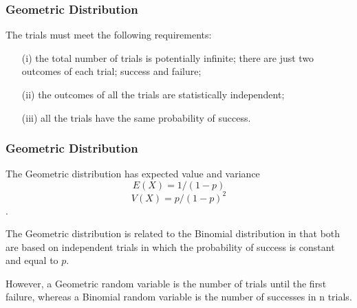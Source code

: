 \documentclass[IntroMain.tex]{subfiles}
\begin{document}
\begin{frame}
	\frametitle{Geometric Distribution}
	\Large
The trials must meet the following requirements:

\begin{itemize}
\item[(i)] the total number of trials is potentially infinite;
there are just two outcomes of each trial; success and failure;
\item[(ii)] the outcomes of all the trials are statistically independent;
\item[(iii)] all the trials have the same probability of success.
\end{itemize}
\end{frame}
\begin{frame}
	\frametitle{Geometric Distribution}
	\Large
The Geometric distribution has expected value and variance  \[E(X)= 1/(1-p)\] \[V(X)=p/{(1-p)^2}\].

The Geometric distribution is related to the Binomial distribution in that both are based on independent trials in which the probability of success is constant and equal to $p$. 

However, a Geometric random variable is the number of trials until the first failure, whereas a Binomial random variable is the number of successes in n trials.
\end{frame}
\end{document}
